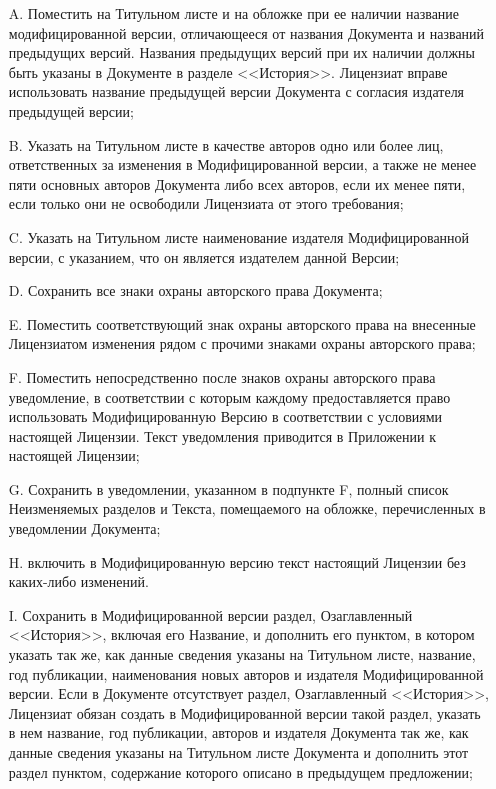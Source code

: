 \begin{itemize}
\item[A.]
   Поместить на Титульном листе и на обложке при ее наличии название
   модифицированной версии, отличающееся от названия Документа и
   названий предыдущих версий. Названия предыдущих версий при их наличии
   должны быть указаны в Документе в разделе <<История>>. Лицензиат
   вправе использовать название предыдущей версии Документа с согласия
   издателя предыдущей версии;

\item[B.]
   Указать на Титульном листе в качестве авторов одно или более лиц,
   ответственных за изменения в Модифицированной версии, а также не
   менее пяти основных авторов Документа либо всех авторов, если их
   менее пяти, если только они не освободили Лицензиата от этого
   требования;

\item[C.]
   Указать на Титульном листе наименование издателя Модифицированной
   версии, с указанием, что он является издателем данной Версии;

\item[D.]
   Сохранить все знаки охраны авторского права Документа;

\item[E.]
   Поместить соответствующий знак охраны авторского права на внесенные
   Лицензиатом изменения рядом с прочими знаками охраны авторского права;

\item[F.]
   Поместить непосредственно после знаков охраны авторского права
   уведомление, в соответствии с которым каждому предоставляется право
   использовать Модифицированную Версию в соответствии с условиями
   настоящей Лицензии. Текст уведомления приводится в Приложении к
   настоящей Лицензии;

\item[G.]
   Сохранить в уведомлении, указанном в подпункте F, полный список
   Неизменяемых разделов и Текста, помещаемого на обложке, перечисленных
   в уведомлении Документа;

\item[H.]
   включить в Модифицированную версию текст настоящий Лицензии без
   каких-либо изменений.

\item[I.]
   Сохранить в Модифицированной версии раздел, Озаглавленный <<История>>,
   включая его Название, и дополнить его пунктом, в котором указать так
   же, как данные сведения указаны на Титульном листе, название, год
   публикации, наименования новых авторов и издателя Модифицированной
   версии. Если в Документе отсутствует раздел, Озаглавленный <<История>>,
   Лицензиат обязан создать в Модифицированной версии такой раздел,
   указать в нем название, год публикации, авторов и издателя Документа
   так же, как данные сведения указаны на Титульном листе Документа и
   дополнить этот раздел пунктом, содержание которого описано в
   предыдущем предложении;


\end{itemize}
